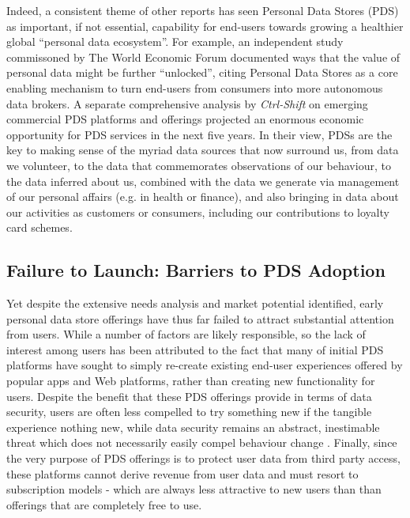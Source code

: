 \documentclass[runningheads,a4paper]{llncs}
\begin{document}

Indeed, a consistent theme of other reports has seen Personal Data Stores (PDS) as important, if not essential, capability for end-users towards growing a healthier global ``personal data ecosystem''.  For example, an independent study commissoned by The World Economic Forum documented ways that the value of personal data might be further ``unlocked'', citing Personal Data Stores as a core enabling mechanism to turn end-users from consumers into more autonomous data brokers\cite{WEF-report}.  A separate comprehensive analysis by \emph{Ctrl-Shift} on emerging commercial PDS platforms and offerings projected an enormous economic opportunity for PDS services in the next five years\cite{ctrlshift}. In their view, PDSs are the key to making sense of the myriad data sources that now surround us, from data we volunteer, to the data that commemorates observations of our behaviour, to the data inferred about us, combined with the data we generate via management of our personal affairs (e.g. in health or finance), and also bringing in data about our activities as customers or consumers, including our contributions to loyalty card schemes.

\subsection{Failure to Launch: Barriers to PDS Adoption}

Yet despite the extensive needs analysis and market potential identified, early personal data store offerings have thus far failed to attract substantial attention from users.  While a number of factors are likely responsible, so the lack of interest among users has been attributed to the fact that many of initial PDS platforms have sought to simply re-create existing end-user experiences offered by popular apps and Web platforms, rather than creating new functionality for users.  Despite the benefit that these PDS offerings provide in terms of data security, users are often less compelled to try something new if the tangible experience nothing new, while data security remains an abstract, inestimable threat which does not necessarily easily compel behaviour change \cite{abstract-threat}.  Finally, since the very purpose of PDS offerings is to protect user data from third party access, these platforms cannot derive revenue from user data and must resort to subscription models - which are always less attractive to new users than than offerings that are completely free to use. 
\end{document}
